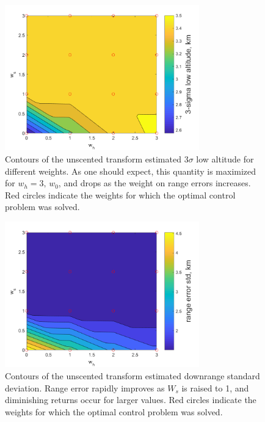 \documentclass[letterpaper, paper,11pt]{AAS}
\begin{document}
\begin{figure}[h!]
	\centering
	\includegraphics[width=0.75\textwidth]{ddp/matlab/ClosedLoopAltitude}
	\caption{Contours of the unscented transform estimated 3$\sigma$ low altitude for different weights. As one should expect, this quantity is maximized for $w_h=3,\,w_0$, and drops as the weight on range errors increases. Red circles indicate the weights for which the optimal control problem was solved.}
	\label{fig_weight_sweep_altitude}
\end{figure}
\begin{figure}[h!]
	\centering
	\includegraphics[width=0.75\textwidth]{ddp/matlab/ClosedLoopRangeError}
	\caption{Contours of the unscented transform estimated downrange standard deviation. Range error rapidly improves as $W_s$ is raised to 1, and diminishing returns occur for larger values. Red circles indicate the weights for which the optimal control problem was solved.}
	\label{fig_weight_sweep_dr}
\end{figure}
\end{document}
